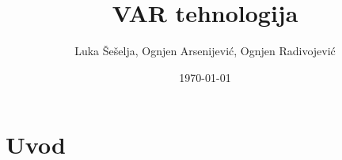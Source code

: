 \documentclass{article}
\title{VAR tehnologija}
\author{Luka Šešelja, Ognjen Arsenijević, Ognjen Radivojević}
\date{\today}
\begin{document}
\maketitle

\section{Uvod}
\end{document}
